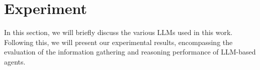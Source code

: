 \documentclass[11pt]{article}
\begin{document}

\section{Experiment}

In this section, we will briefly discuss the various LLMs used in this work. Following this, we will present our experimental results, encompassing the evaluation of the information gathering and reasoning performance of LLM-based agents.
\end{document}
